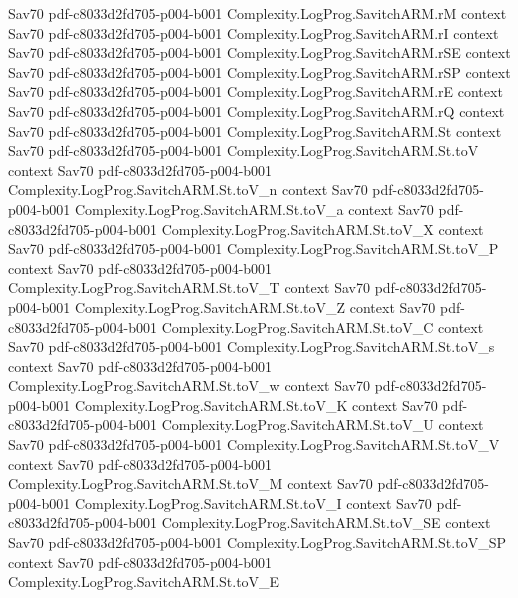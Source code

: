 \begin{theorem}
  {Sav70}
  {pdf-c8033d2fd705-p004-b001}
\proofstep
  {Complexity.LogProg.SavitchARM.rM}
  {context}
  {Sav70}
  {pdf-c8033d2fd705-p004-b001}
\proofstep
  {Complexity.LogProg.SavitchARM.rI}
  {context}
  {Sav70}
  {pdf-c8033d2fd705-p004-b001}
\proofstep
  {Complexity.LogProg.SavitchARM.rSE}
  {context}
  {Sav70}
  {pdf-c8033d2fd705-p004-b001}
\proofstep
  {Complexity.LogProg.SavitchARM.rSP}
  {context}
  {Sav70}
  {pdf-c8033d2fd705-p004-b001}
\proofstep
  {Complexity.LogProg.SavitchARM.rE}
  {context}
  {Sav70}
  {pdf-c8033d2fd705-p004-b001}
\proofstep
  {Complexity.LogProg.SavitchARM.rQ}
  {context}
  {Sav70}
  {pdf-c8033d2fd705-p004-b001}
\proofstep
  {Complexity.LogProg.SavitchARM.St}
  {context}
  {Sav70}
  {pdf-c8033d2fd705-p004-b001}
\proofstep
  {Complexity.LogProg.SavitchARM.St.toV}
  {context}
  {Sav70}
  {pdf-c8033d2fd705-p004-b001}
\proofstep
  {Complexity.LogProg.SavitchARM.St.toV_n}
  {context}
  {Sav70}
  {pdf-c8033d2fd705-p004-b001}
\proofstep
  {Complexity.LogProg.SavitchARM.St.toV_a}
  {context}
  {Sav70}
  {pdf-c8033d2fd705-p004-b001}
\proofstep
  {Complexity.LogProg.SavitchARM.St.toV_X}
  {context}
  {Sav70}
  {pdf-c8033d2fd705-p004-b001}
\proofstep
  {Complexity.LogProg.SavitchARM.St.toV_P}
  {context}
  {Sav70}
  {pdf-c8033d2fd705-p004-b001}
\proofstep
  {Complexity.LogProg.SavitchARM.St.toV_T}
  {context}
  {Sav70}
  {pdf-c8033d2fd705-p004-b001}
\proofstep
  {Complexity.LogProg.SavitchARM.St.toV_Z}
  {context}
  {Sav70}
  {pdf-c8033d2fd705-p004-b001}
\proofstep
  {Complexity.LogProg.SavitchARM.St.toV_C}
  {context}
  {Sav70}
  {pdf-c8033d2fd705-p004-b001}
\proofstep
  {Complexity.LogProg.SavitchARM.St.toV_s}
  {context}
  {Sav70}
  {pdf-c8033d2fd705-p004-b001}
\proofstep
  {Complexity.LogProg.SavitchARM.St.toV_w}
  {context}
  {Sav70}
  {pdf-c8033d2fd705-p004-b001}
\proofstep
  {Complexity.LogProg.SavitchARM.St.toV_K}
  {context}
  {Sav70}
  {pdf-c8033d2fd705-p004-b001}
\proofstep
  {Complexity.LogProg.SavitchARM.St.toV_U}
  {context}
  {Sav70}
  {pdf-c8033d2fd705-p004-b001}
\proofstep
  {Complexity.LogProg.SavitchARM.St.toV_V}
  {context}
  {Sav70}
  {pdf-c8033d2fd705-p004-b001}
\proofstep
  {Complexity.LogProg.SavitchARM.St.toV_M}
  {context}
  {Sav70}
  {pdf-c8033d2fd705-p004-b001}
\proofstep
  {Complexity.LogProg.SavitchARM.St.toV_I}
  {context}
  {Sav70}
  {pdf-c8033d2fd705-p004-b001}
\proofstep
  {Complexity.LogProg.SavitchARM.St.toV_SE}
  {context}
  {Sav70}
  {pdf-c8033d2fd705-p004-b001}
\proofstep
  {Complexity.LogProg.SavitchARM.St.toV_SP}
  {context}
  {Sav70}
  {pdf-c8033d2fd705-p004-b001}
\proofstep
  {Complexity.LogProg.SavitchARM.St.toV_E}

\end{theorem}
